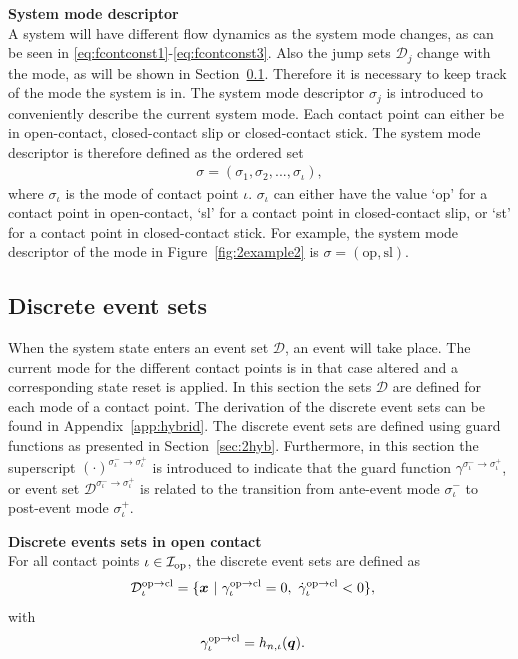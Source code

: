 \documentclass[../DC2017114Bouma.tex]{subfiles}
\begin{document}
\textbf{System mode descriptor}\\
A system will have different flow dynamics as the system mode changes, as can be seen in \eqref{eq:fcontconst1}-\eqref{eq:fcontconst3}. Also the jump sets $\mathcal{D}_j$ change with the mode, as will be shown in Section~\ref{sec:2event}. Therefore it is necessary to keep track of the mode the system is in. The system mode descriptor $\sigma_j$ is introduced to conveniently describe the current system mode. Each contact point can either be in open-contact, closed-contact slip or closed-contact stick. The system mode descriptor is therefore defined as the ordered set
\begin{align}
\sigma = (\sigma_1,\sigma_2,...,\sigma_\iota),
\end{align}
where $\sigma_\iota$ is the mode of contact point $\iota$. $\sigma_\iota$ can either have the value `op' for a contact point in open-contact, `sl' for a contact point in closed-contact slip, or `st' for a contact point in closed-contact stick. For example, the system mode descriptor of the mode in Figure~\ref{fig:2example2} is $\sigma = (\text{op},\text{sl})$.

\subsection{Discrete event sets}\label{sec:2event}
When the system state enters an event set $\mathcal{D}$, an event will take place. The current mode for the different contact points is in that case altered and a corresponding state reset is applied. In this section the sets $\mathcal{D}$ are defined for each mode of a contact point. The derivation of the discrete event sets can be found in Appendix~\ref{app:hybrid}. The discrete event sets are defined using guard functions as presented in Section~\ref{sec:2hyb}. Furthermore, in this section the superscript $(\cdot)^{\sigma_\iota^-\rightarrow\sigma_\iota^+}$ is introduced to indicate that the guard function $\gamma^{\sigma_\iota^-\rightarrow\sigma_\iota^+}$, or event set $\mathcal{D}^{\sigma_\iota^-\rightarrow\sigma_\iota^+}$ is related to the transition from ante-event mode $\sigma_\iota^-$ to post-event mode $\sigma_\iota^+$.

\textbf{Discrete events sets in open contact}\\
For all contact points $\iota\in\mathcal{I}_{\text{op}}$, the discrete event sets are defined as
\begin{align}
\mathcal{D}^{\text{op}\rightarrow\text{cl}}_{\iota} &= \{ \xb\ |\ \gamma^{\text{op}\rightarrow\text{cl}}_{\iota} = 0,\ \dot{\gamma}^{\text{op}\rightarrow\text{cl}}_{\iota} < 0 \},\label{eq:2Dopcl}
\end{align}
%
with
\begin{align}
\gamma^{\text{op}\rightarrow\text{cl}}_{\iota} &= h_{n,\iota}({\boldsymbol{q}}).
\end{align}
\end{document}

